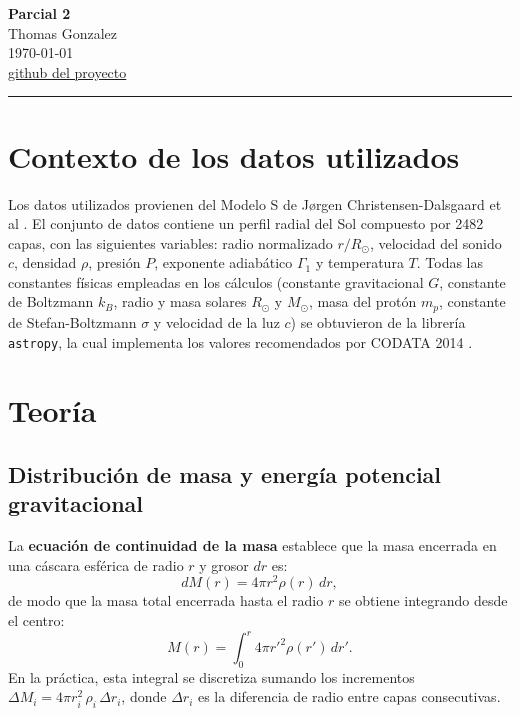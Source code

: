 \documentclass[12pt, a4paper]{article}
\begin{document}
\begin{center}
   {\LARGE\bfseries Parcial 2}\\[0.8em]
   {\large Thomas Gonzalez}\\[0.3em]
   {\normalsize \today}\\[0.4em]
   {\small \href{https://github.com/thomatrixting/solar_esturcture_modeling}{github del proyecto}}
\end{center}


\vspace{1em}
\hrule
\vspace{1.5em}


\section*{Contexto de los datos utilizados}


Los datos utilizados provienen del Modelo S de Jørgen Christensen-Dalsgaard et al \cite{ChristensenDalsgaard1996}.
El conjunto de datos contiene un perfil radial del Sol compuesto por 2482 capas, con las siguientes variables: radio normalizado $r/R_\odot$, velocidad del sonido $c$, densidad $\rho$, presión $P$, exponente adiabático $\Gamma_1$ y temperatura $T$.
Todas las constantes físicas empleadas en los cálculos (constante gravitacional $G$, constante de Boltzmann $k_B$, radio y masa solares $R_\odot$ y $M_\odot$, masa del protón $m_p$, constante de Stefan-Boltzmann $\sigma$ y velocidad de la luz $c$) se obtuvieron de la librería \texttt{astropy}, la cual implementa los valores recomendados por CODATA 2014 \cite{mohrCODATARecommendedValues2016}.


\section*{Teoría}


\subsection*{Distribución de masa y energía potencial gravitacional}


La \textbf{ecuación de continuidad de la masa} establece que la masa encerrada en una cáscara esférica de radio $r$ y grosor $dr$ es:
\begin{equation}
   dM(r) = 4\pi r^2 \rho(r)\, dr,
\end{equation}
de modo que la masa total encerrada hasta el radio $r$ se obtiene integrando desde el centro:
\begin{equation}
   M(r) = \int_0^r 4\pi r'^2 \rho(r')\, dr'.
\end{equation}
En la práctica, esta integral se discretiza sumando los incrementos $\Delta M_i = 4\pi r_i^2\,\rho_i\,\Delta r_i$, donde $\Delta r_i$ es la diferencia de radio entre capas consecutivas.
\end{document}
